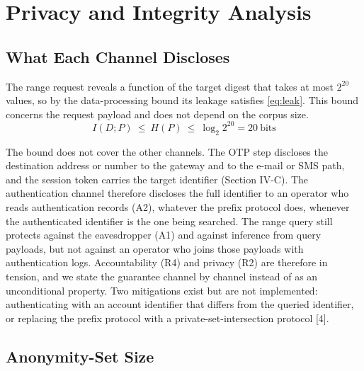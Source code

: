 \documentclass[10pt,twocolumn]{article}
\begin{document}
\section{Privacy and Integrity Analysis}

\subsection{What Each Channel Discloses}

The range request reveals a function of the target digest that takes at most $2^{20}$ values, so by the data-processing bound its leakage satisfies \eqref{eq:leak}. This bound concerns the request payload and does not depend on the corpus size.
\begin{equation}
I(D;P)\ \le\ H(P)\ \le\ \log_2 2^{20}=20\ \text{bits}
\label{eq:leak}
\end{equation}

The bound does not cover the other channels. The OTP step discloses the destination address or number to the gateway and to the e-mail or SMS path, and the session token carries the target identifier (Section IV-C). The authentication channel therefore discloses the full identifier to an operator who reads authentication records (A2), whatever the prefix protocol does, whenever the authenticated identifier is the one being searched. The range query still protects against the eavesdropper (A1) and against inference from query payloads, but not against an operator who joins those payloads with authentication logs. Accountability (R4) and privacy (R2) are therefore in tension, and we state the guarantee channel by channel instead of as an unconditional property. Two mitigations exist but are not implemented: authenticating with an account identifier that differs from the queried identifier, or replacing the prefix protocol with a private-set-intersection protocol [4].

\subsection{Anonymity-Set Size}
\end{document}
